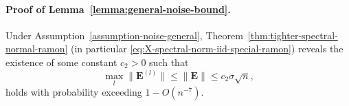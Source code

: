 %
%
%
%
%
%
\paragraph{Proof of Lemma~\ref{lemma:general-noise-bound}.}

Under Assumption~\ref{assumption-noise-general}, Theorem~\ref{thm:tighter-spectral-normal-ramon}
(in particular \eqref{eq:X-spectral-norm-iid-special-ramon}) reveals
the existence of some constant $c_{2}>0$ such that
\[
\max_{l}\big\|\bm{E}^{(l)}\big\|\leq\|\bm{E}\|\leq c_{2}\sigma\sqrt{n},
\]
holds with probability exceeding $1-O(n^{-7})$.

